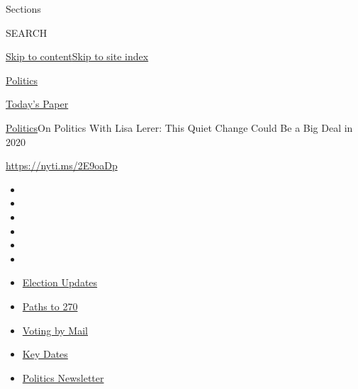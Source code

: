 Sections

SEARCH

\protect\hyperlink{site-content}{Skip to
content}\protect\hyperlink{site-index}{Skip to site index}

\href{https://www.nytimes3xbfgragh.onion/section/politics}{Politics}

\href{https://myaccount.nytimes3xbfgragh.onion/auth/login?response_type=cookie\&client_id=vi}{}

\href{https://www.nytimes3xbfgragh.onion/section/todayspaper}{Today's
Paper}

\href{/section/politics}{Politics}\textbar{}On Politics With Lisa Lerer:
This Quiet Change Could Be a Big Deal in 2020

\url{https://nyti.ms/2E9oaDp}

\begin{itemize}
\item
\item
\item
\item
\item
\item
\end{itemize}

\begin{itemize}
\item
  \href{https://www.nytimes3xbfgragh.onion/live/2020/09/08/us/trump-vs-biden?action=click\&pgtype=Article\&state=default\&region=TOP_BANNER\&context=storylines_menu}{Election
  Updates}
\item
  \href{https://www.nytimes3xbfgragh.onion/interactive/2020/us/elections/election-states-biden-trump.html?action=click\&pgtype=Article\&state=default\&region=TOP_BANNER\&context=storylines_menu}{Paths
  to 270}
\item
  \href{https://www.nytimes3xbfgragh.onion/interactive/2020/08/31/us/politics/vote-by-mail-deadlines.html?action=click\&pgtype=Article\&state=default\&region=TOP_BANNER\&context=storylines_menu}{Voting
  by Mail}
\item
  \href{https://www.nytimes3xbfgragh.onion/interactive/2019/us/elections/2020-presidential-election-calendar.html?action=click\&pgtype=Article\&state=default\&region=TOP_BANNER\&context=storylines_menu}{Key
  Dates}
\item
  \href{https://www.nytimes3xbfgragh.onion/newsletters/politics?action=click\&pgtype=Article\&state=default\&region=TOP_BANNER\&context=storylines_menu}{Politics
  Newsletter}
\end{itemize}

